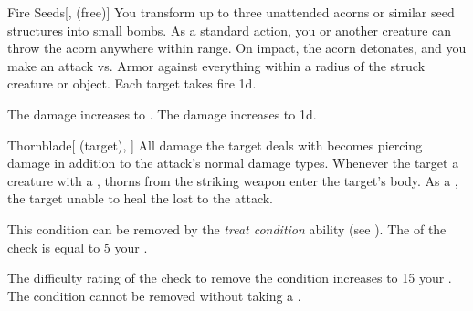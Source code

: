 \lowercase{\hypertarget{spell:Fire Seeds}{}}\label{spell:Fire Seeds}
\begin{freeability}[Rank 3]{\hypertarget{spell:Fire Seeds}{Fire Seeds}}[,  (free)]
You transform up to three unattended acorns or similar seed structures into small bombs.
As a standard action, you or another creature can throw the acorn anywhere within \rngclose range.
On impact, the acorn detonates, and you make an attack vs. Armor against everything within a \areasmall radius of the struck creature or object.
\hit Each target takes fire  \minus1d.

\rankline
{} The damage increases to .
 The damage increases to  \plus1d.
\end{freeability}
\vspace{0.25em}



\lowercase{\hypertarget{spell:Thornblade}{}}\label{spell:Thornblade}
\begin{attuneability}[Rank 3]{\hypertarget{spell:Thornblade}{Thornblade}}[ (target), ]
All damage the target deals with  becomes piercing damage in addition to the attack's normal damage types.
Whenever the target  a creature with a , thorns from the striking weapon enter the target's body.
As a , the target unable to heal the  lost to the attack.

This condition can be removed by the \textit{treat condition} ability (see ).
The  of the check is equal to 5 \add your .

\rankline
{} The difficulty rating of the check to remove the condition increases to 15 \add your .
 The condition cannot be removed without taking a .
\end{attuneability}
\vspace{0.25em}



